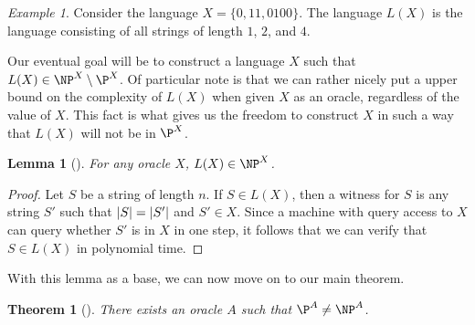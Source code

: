 \documentclass[english,12pt]{reedthesis}
\theoremstyle{plain}
\newtheorem{thm}{Theorem}[section]
\newtheorem{lemma}[lemma]{Lemma}
\theoremstyle{definition}
\theoremstyle{remark}
\newtheorem{example}{Example}[thm]
\DeclarePairedDelimiter{\abs}{\lvert}{\rvert}
\begin{document}
\begin{example}\label{ex:l(x)-simple}
  Consider the language $X = \{0, 11, 0100\}$. The language $L(X)$ is the
  language consisting of all strings of length $1$, $2$, and $4$.
\end{example}

Our eventual goal will be to construct a language $X$ such that
$L(X) \in \NP^{X} \setminus \P^{X}$. Of particular note is that we can rather nicely put a
upper bound on the complexity of $L(X)$ when given $X$ as an oracle, regardless
of the value of $X$. This fact is what gives us the freedom to construct $X$ in
such a way that $L(X)$ will not be in $\P^{X}$.

\begin{lemma}[{\cite[436]{BGS75}}]\label{lem:l(x)-in-np}
  For any oracle $X$, $L(X) \in \NP^{X}$.
\end{lemma}

\begin{proof}
  Let $S$ be a string of length $n$. If $S \in L(X)$, then a witness for $S$ is
  any string $S'$ such that $\abs{S} = \abs{S'}$ and $S' \in X$. Since a machine
  with query access to $X$ can query whether $S'$ is in $X$ in one step, it
  follows that we can verify that $S \in L(X)$ in polynomial time.
\end{proof}

With this lemma as a base, we can now move on to our main theorem.

\begin{thm}[{\cite[Theorem 3]{BGS75}}]\label{thm:p-np-nrel}
  There exists an oracle $A$ such that $\P^{A} \ne \NP^{A}$.
\end{thm}
\end{document}
